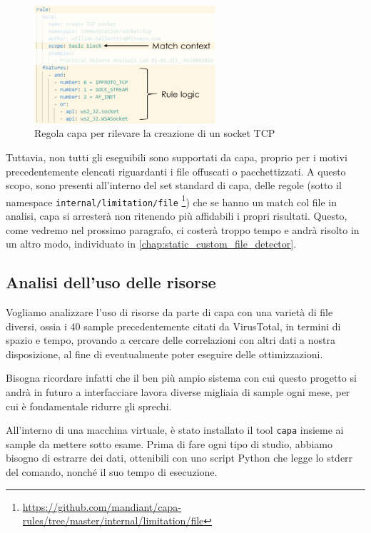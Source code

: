 \begin{figure}[!htb]
    \centering
    \includegraphics[width=0.6\textwidth]{assets/capa_example_rule.png}
    \caption{Regola capa per rilevare la creazione di un socket TCP}
    \label{fig:capa_rule_socket_tcp}
\end{figure}

Tuttavia, non tutti gli eseguibili sono supportati da capa, proprio per i motivi precedentemente elencati riguardanti i file offuscati o pacchettizzati. A questo scopo, sono presenti all'interno del set standard di capa, delle regole
(sotto il namespace \texttt{internal/limitation/file} \footnote{\url{https://github.com/mandiant/capa-rules/tree/master/internal/limitation/file}})
che se hanno un match col file in analisi, capa si arresterà non ritenendo più affidabili i propri risultati.
Questo, come vedremo nel prossimo paragrafo, ci costerà troppo tempo e andrà risolto in un altro modo, individuato in \ref{chap:static_custom_file_detector}.

\subsection{Analisi dell'uso delle risorse}
Vogliamo analizzare l'uso di risorse da parte di capa con una varietà di file diversi, ossia i 40 sample precedentemente citati da VirusTotal, in termini di spazio e tempo, provando a cercare delle correlazioni con altri dati a nostra disposizione, al fine di eventualmente poter eseguire delle ottimizzazioni.

Bisogna ricordare infatti che il ben più ampio sistema con cui questo progetto si andrà in futuro a interfacciare lavora diverse migliaia di sample ogni mese, per cui è fondamentale ridurre gli sprechi.

All'interno di una macchina virtuale, è stato installato il tool \texttt{capa} insieme ai sample da mettere sotto esame.
Prima di fare ogni tipo di studio, abbiamo bisogno di estrarre dei dati, ottenibili con uno script Python che legge lo stderr del comando, nonché il suo tempo di esecuzione.

